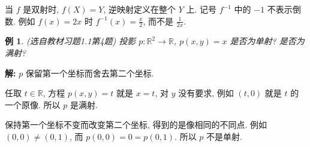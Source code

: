 \documentclass[UTF8,openany]{ctexbook}
\theoremstyle{chinesetextbook}
\newtheorem{example}{例}[section]
\newenvironment{cnsolution}{\par\indent\textbf{解:} \ignorespaces}{\par}
\begin{document}
当 $f$ 是双射时, $f(X)=Y$, 逆映射定义在整个 $Y$ 上. 记号 $f^{-1}$ 中的 $-1$ 不表示倒数. 例如 $f(x)=2x$ 时 $\displaystyle f^{-1}(x)=\frac x2$, 而不是 $\displaystyle\frac1{2x}$.
\begin{example}
\textnormal{(选自教材习题1.1第4题)} 投影 $p:\mathbb R^2\to\mathbb R$, $p(x,y)=x$ 是否为单射? 是否为满射?
\end{example}
\begin{cnsolution}
$p$ 保留第一个坐标而舍去第二个坐标.

任取 $t\in\mathbb R$, 方程 $p(x,y)=t$ 就是 $x=t$, 对 $y$ 没有要求, 例如 $(t,0)$ 就是 $t$ 的一个原像. 所以 $p$ 是满射.

保持第一个坐标不变而改变第二个坐标, 得到的是像相同的不同点. 例如 $(0,0)\ne(0,1)$, 而 $p(0,0)=0=p(0,1)$. 所以 $p$ 不是单射.
\end{cnsolution}
\end{document}

